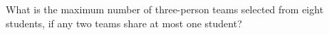 What is the maximum number of three-person teams selected from eight students, if any two teams share at most one student?
